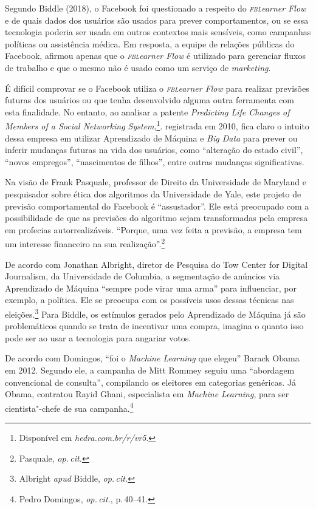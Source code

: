 Segundo Biddle (2018), o Facebook foi questionado a respeito do
\textit{\textsc{fbl}earner Flow} e de quais dados dos usuários são usados para
prever comportamentos, ou se essa tecnologia poderia ser usada em outros
contextos mais sensíveis, como campanhas políticas ou assistência
médica. Em resposta, a equipe de relações públicas do Facebook, afirmou
apenas que o \textit{\textsc{fbl}earner Flow} é utilizado para gerenciar fluxos
de trabalho e que o mesmo não é usado como um serviço de \textit{marketing}.

É difícil comprovar se o Facebook utiliza o \textit{\textsc{fbl}earner Flow}
para realizar previsões futuras dos usuários ou que tenha desenvolvido
alguma outra ferramenta com esta finalidade. No entanto, ao analisar a
patente \textit{Predicting Life Changes of Members of a Social
Networking System},\footnote{Disponível em \textit{hedra.com.br/r/vr5}.}.
registrada em 2010, fica claro o intuito dessa empresa em utilizar
Aprendizado de Máquina e \textit{Big Data} para prever ou inferir mudanças
futuras na vida dos usuários, como ``alteração do estado civil'',
``novos empregos'', ``nascimentos de filhos'', entre outras mudanças
significativas.

Na visão de Frank Pasquale, professor de Direito da Universidade de
Maryland e pesquisador sobre ética dos algoritmos da Universidade de
Yale, este projeto de previsão comportamental do Facebook é
``assustador''. Ele está preocupado com a possibilidade de que as
previsões do algoritmo sejam transformadas pela empresa em profecias
autorrealizáveis. ``Porque, uma vez feita a previsão, a empresa tem um
interesse financeiro na sua realização''.\footnote{Pasquale, \textit{op.\,cit.}}

De acordo com Jonathan Albright, diretor de Pesquisa do Tow Center for
Digital Journalism, da Universidade de Columbia, a segmentação de
anúncios via Aprendizado de Máquina ``sempre pode virar uma arma'' para
influenciar, por exemplo, a política. Ele se preocupa com os possíveis
usos dessas técnicas nas eleições.\footnote{Albright \textit{apud} Biddle, \textit{op.\,cit.}}
Para Biddle, os estímulos gerados pelo Aprendizado de Máquina já
são problemáticos quando se trata de incentivar uma compra, imagina o
quanto isso pode ser ao usar a tecnologia para angariar votos.

De acordo com Domingos, ``foi o \textit{Machine Learning} que
elegeu'' Barack Obama em 2012. Segundo ele, a campanha de Mitt Rommey
seguiu uma ``abordagem convencional de consulta'', compilando os
eleitores em categorias genéricas. Já Obama, contratou Rayid Ghani,
especialista em \textit{Machine Learning}, para ser cientista"-chefe de sua
campanha.\footnote{Pedro Domingos, \textit{op.\,cit.}, p.\,40--41.}

